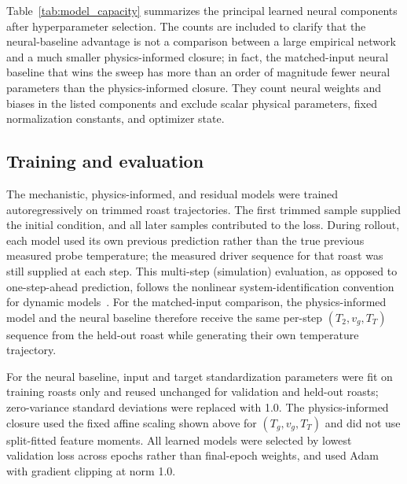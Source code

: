 \documentclass[fleqn,10pt]{wlscirep}
\begin{document}
Table~\ref{tab:model_capacity} summarizes the principal learned neural components after hyperparameter selection. The counts are included to clarify that the neural-baseline advantage is not a comparison between a large empirical network and a much smaller physics-informed closure; in fact, the matched-input neural baseline that wins the sweep has more than an order of magnitude fewer neural parameters than the physics-informed closure. They count neural weights and biases in the listed components and exclude scalar physical parameters, fixed normalization constants, and optimizer state.

\subsection*{Training and evaluation}

The mechanistic, physics-informed, and residual models were trained autoregressively on trimmed roast trajectories. The first trimmed sample supplied the initial condition, and all later samples contributed to the loss. During rollout, each model used its own previous prediction rather than the true previous measured probe temperature; the measured driver sequence for that roast was still supplied at each step. This multi-step (simulation) evaluation, as opposed to one-step-ahead prediction, follows the nonlinear system-identification convention for dynamic models~\cite{ljung1999,pillonetto2025}. For the matched-input comparison, the physics-informed model and the neural baseline therefore receive the same per-step $(T_2,v_g,T_T)$ sequence from the held-out roast while generating their own temperature trajectory.

For the neural baseline, input and target standardization parameters were fit on training roasts only and reused unchanged for validation and held-out roasts; zero-variance standard deviations were replaced with 1.0. The physics-informed closure used the fixed affine scaling shown above for $(T_g,v_g,T_T)$ and did not use split-fitted feature moments. All learned models were selected by lowest validation loss across epochs rather than final-epoch weights, and used Adam with gradient clipping at norm 1.0.
\end{document}
